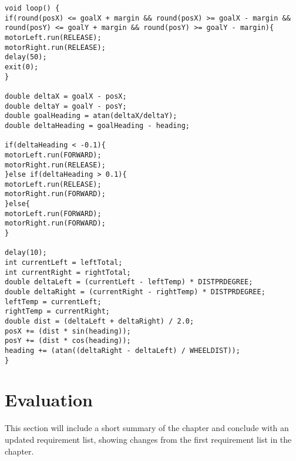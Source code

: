 \begin{lstlisting}[caption={The loop function}, label={loop}]
void loop() {
if(round(posX) <= goalX + margin && round(posX) >= goalX - margin &&     round(posY) <= goalY + margin && round(posY) >= goalY - margin){
motorLeft.run(RELEASE);
motorRight.run(RELEASE);
delay(50);
exit(0);
}

double deltaX = goalX - posX;
double deltaY = goalY - posY;
double goalHeading = atan(deltaX/deltaY);
double deltaHeading = goalHeading - heading;

if(deltaHeading < -0.1){
motorLeft.run(FORWARD);
motorRight.run(RELEASE);
}else if(deltaHeading > 0.1){
motorLeft.run(RELEASE);
motorRight.run(FORWARD);
}else{
motorLeft.run(FORWARD);
motorRight.run(FORWARD);
}

delay(10);
int currentLeft = leftTotal;
int currentRight = rightTotal;
double deltaLeft = (currentLeft - leftTemp) * DISTPRDEGREE;
double deltaRight = (currentRight - rightTemp) * DISTPRDEGREE;
leftTemp = currentLeft;
rightTemp = currentRight;
double dist = (deltaLeft + deltaRight) / 2.0;
posX += (dist * sin(heading));
posY += (dist * cos(heading));
heading += (atan((deltaRight - deltaLeft) / WHEELDIST));
}
\end{lstlisting}



\section{Evaluation}
\label{sec:i2Evaluation}
This section will include a short summary of the chapter and conclude with an updated requirement list, showing changes from the first requirement list in the chapter.